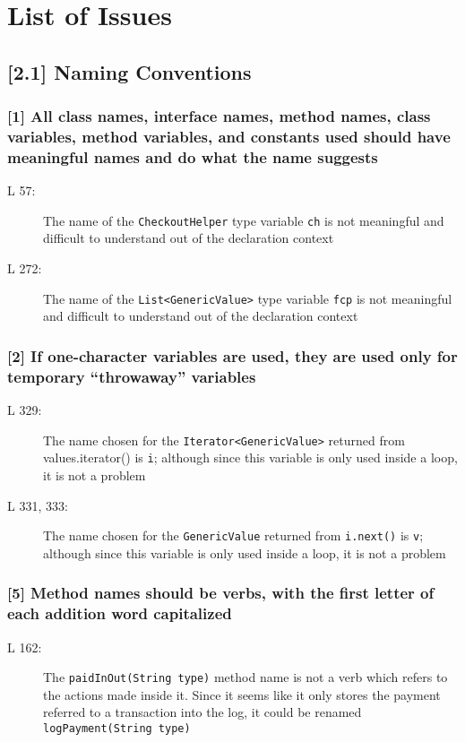 \section{List of Issues}
\subsection*{[2.1] Naming Conventions}
\subsubsection*{[1] All class names, interface names, method names, class variables, method variables, and constants used should have meaningful names and do what the name suggests}
\begin{description}
	\item[L 57:] The name of the {\tt CheckoutHelper} type variable {\tt ch} is not meaningful and difficult to understand out of the declaration context
	\item[L 272:] The name of the {\tt List<GenericValue>} type variable {\tt fcp} is not meaningful and difficult to understand out of the declaration context
\end{description}

\subsubsection*{[2] If one-character variables are used, they are used only for temporary “throwaway” variables}
\begin{description}
	\item[L 329:] The name chosen for the {\tt Iterator<GenericValue>} returned from {values.iterator()} is {\tt i}; although since this variable is only used inside a loop, it is not a problem
	\item[L 331, 333:] The name chosen for the {\tt GenericValue} returned from {\tt i.next()} is {\tt v}; although since this variable is only used inside a loop, it is not a problem
\end{description}

\subsubsection*{[5] Method names should be verbs, with the first letter of each addition word capitalized}
\begin{description}
	\item[L 162:] The {\tt paidInOut(String type)} method name is not a verb which refers to the actions made inside it. Since it seems like it only stores the payment referred to a transaction into the log, it could be renamed {\tt logPayment(String type)}
\end{description}

